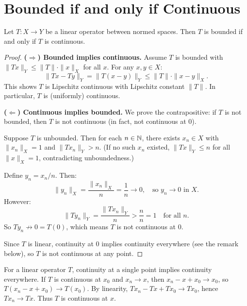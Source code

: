 \documentclass[11pt,a4paper]{article}
\begin{document}

\section{Bounded if and only if Continuous}
\label{sec:bounded_iff_cts}

\begin{theorem}
\label{thm:bounded_iff_cts}
Let $T \colon X \to Y$ be a linear operator between normed spaces. Then $T$
is bounded if and only if $T$ is continuous.
\end{theorem}

\begin{proof}
\textbf{($\Rightarrow$) Bounded implies continuous.}
Assume $T$ is bounded with $\|Tx\|_Y \le \|T\| \cdot \|x\|_X$ for all $x$.
For any $x, y \in X$:
\[
\|Tx - Ty\|_Y = \|T(x - y)\|_Y \le \|T\| \cdot \|x - y\|_X.
\]
This shows $T$ is Lipschitz continuous with Lipschitz constant $\|T\|$.
In particular, $T$ is (uniformly) continuous.

\textbf{($\Leftarrow$) Continuous implies bounded.}
We prove the contrapositive: if $T$ is not bounded, then $T$ is not
continuous (in fact, not continuous at $0$).

Suppose $T$ is unbounded. Then for each $n \in \mathbb{N}$, there exists
$x_n \in X$ with $\|x_n\|_X = 1$ and $\|Tx_n\|_Y > n$. (If no such $x_n$
existed, $\|Tx\|_Y \le n$ for all $\|x\|_X = 1$, contradicting
unboundedness.)

Define $y_n = x_n / n$. Then:
\[
\|y_n\|_X = \frac{\|x_n\|_X}{n} = \frac{1}{n} \to 0,
\quad \text{so } y_n \to 0 \text{ in } X.
\]
However:
\[
\|Ty_n\|_Y = \frac{\|Tx_n\|_Y}{n} > \frac{n}{n} = 1 \quad
\text{for all } n.
\]
So $Ty_n \not\to 0 = T(0)$, which means $T$ is not continuous at $0$.

Since $T$ is linear, continuity at $0$ implies continuity everywhere (see
the remark below), so $T$ is not continuous at any point.
\end{proof}

\begin{remark}
\label{rem:cts_at_zero}
For a linear operator $T$, continuity at a single point implies continuity
everywhere. If $T$ is continuous at $x_0$ and $x_n \to x$, then
$x_n - x + x_0 \to x_0$, so $T(x_n - x + x_0) \to T(x_0)$. By linearity,
$Tx_n - Tx + Tx_0 \to Tx_0$, hence $Tx_n \to Tx$. Thus $T$ is continuous
at $x$.
\end{remark}
\end{document}
